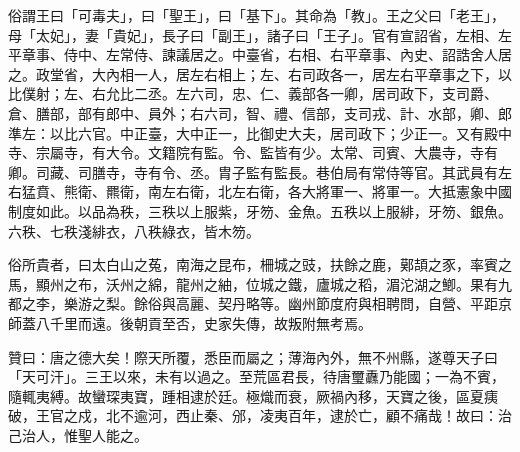 \begin{pinyinscope}
 俗謂王曰「可毒夫」，曰「聖王」，曰「基下」。其命為「教」。王之父曰「老王」，母「太妃」，妻「貴妃」，長子曰「副王」，諸子曰「王子」。官有宣詔省，左相、左平章事、侍中、左常侍、諫議居之。中臺省，右相、右平章事、內史、詔誥舍人居之。政堂省，大內相一人，居左右相上；左、右司政各一，居左右平章事之下，以比僕射；左、右允比二丞。左六司，忠、仁、義部各一卿，居司政下，支司爵、倉、膳部，部有郎中、員外；右六司，智、禮、信部，支司戎、計、水部，卿、郎準左：以比六官。中正臺，大中正一，比御史大夫，居司政下；少正一。又有殿中寺、宗屬寺，有大令。文籍院有監。令、監皆有少。太常、司賓、大農寺，寺有卿。司藏、司膳寺，寺有令、丞。胄子監有監長。巷伯局有常侍等官。其武員有左右猛賁、熊衛、羆衛，南左右衛，北左右衛，各大將軍一、將軍一。大抵憲象中國制度如此。以品為秩，三秩以上服紫，牙笏、金魚。五秩以上服緋，牙笏、銀魚。六秩、七秩淺緋衣，八秩綠衣，皆木笏。



 俗所貴者，曰太白山之菟，南海之昆布，柵城之豉，扶餘之鹿，鄚頡之豕，率賓之馬，顯州之布，沃州之綿，龍州之紬，位城之鐵，廬城之稻，湄沱湖之鯽。果有九都之李，樂游之梨。餘俗與高麗、契丹略等。幽州節度府與相聘問，自營、平距京師蓋八千里而遠。後朝貢至否，史家失傳，故叛附無考焉。



 贊曰：唐之德大矣！際天所覆，悉臣而屬之；薄海內外，無不州縣，遂尊天子曰「天可汗」。三王以來，未有以過之。至荒區君長，待唐璽纛乃能國；一為不賓，隨輒夷縛。故蠻琛夷寶，踵相逮於廷。極熾而衰，厥禍內移，天寶之後，區夏痍破，王官之戍，北不逾河，西止秦、邠，凌夷百年，逮於亡，顧不痛哉！故曰：治己治人，惟聖人能之。



\end{pinyinscope}
